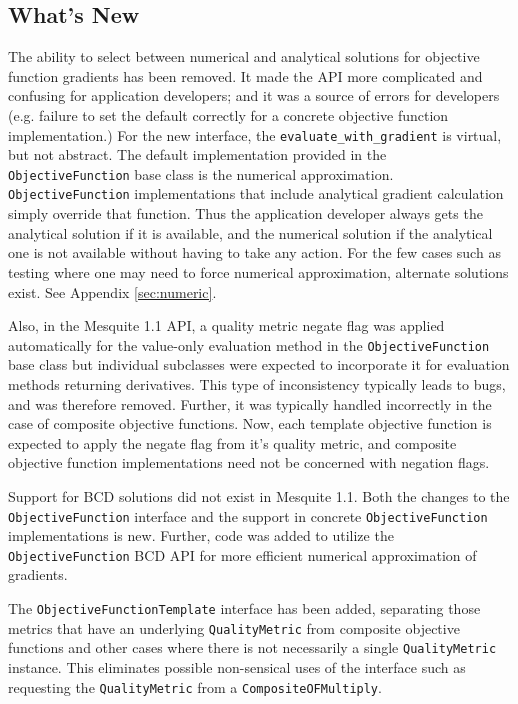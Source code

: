 \documentclass{article}
\begin{document}
\subsection{What's New}

The ability to select between numerical and analytical solutions for objective function gradients has been removed.  It made the API more complicated and confusing for application developers; and it was a source of errors for developers (e.g. failure to set the default correctly for a concrete objective function implementation.)  For the new interface, the \texttt{evaluate\_with\_gradient} is virtual, but not abstract.  The default implementation provided in the \texttt{ObjectiveFunction} base class is the numerical approximation.  \texttt{ObjectiveFunction} implementations that include analytical gradient calculation simply override that function.  Thus the application developer always gets the analytical solution if it is available, and the numerical solution if the analytical one is not available without having to take any action.  For the few cases such as testing where one may need to force numerical approximation, alternate solutions exist. See Appendix \ref{sec:numeric}.

Also, in the Mesquite 1.1 API, a quality metric negate flag was applied automatically for the value-only evaluation method in the \texttt{ObjectiveFunction} base class but individual subclasses were expected to incorporate it for evaluation methods returning derivatives.  This type of inconsistency typically leads to bugs, and was therefore removed.  Further, it was typically handled incorrectly in the case of composite objective functions.  Now, each template objective function is expected to apply the negate flag from it's quality metric, and composite objective function implementations need not be concerned with negation flags.

Support for BCD solutions did not exist in Mesquite 1.1.  Both the changes to the \texttt{ObjectiveFunction} interface and the support in concrete \texttt{ObjectiveFunction} implementations is new.  Further, code was added to utilize the \texttt{ObjectiveFunction} BCD API for more efficient numerical approximation of gradients.

The \texttt{ObjectiveFunctionTemplate} interface has been added, separating those metrics that have an underlying \texttt{QualityMetric} from composite objective functions and other cases where there is not necessarily a single \texttt{QualityMetric} instance.  This eliminates possible non-sensical uses of the interface such as requesting the \texttt{QualityMetric} from a \texttt{CompositeOFMultiply}.
\end{document}
